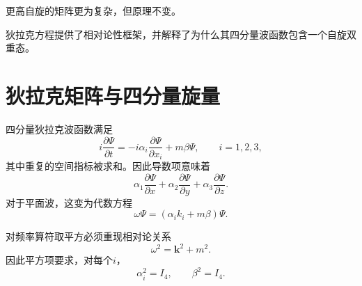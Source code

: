更高自旋的矩阵更为复杂，但原理不变。

\begin{classroomqa}
\end{classroomqa}

\begin{classroomqa}
\end{classroomqa}

狄拉克方程提供了相对论性框架，并解释了为什么其四分量波函数包含一个自旋双重态。

\section{狄拉克矩阵与四分量旋量}

四分量狄拉克波函数满足
\begin{equation}
i\frac{\partial\Psi}{\partial t}
=
-i\alpha_i\frac{\partial\Psi}{\partial x_i}
+m\beta\Psi,
\qquad i=1,2,3,
\end{equation}
其中重复的空间指标被求和。因此导数项意味着
\begin{equation}
\alpha_1\frac{\partial\Psi}{\partial x}
+\alpha_2\frac{\partial\Psi}{\partial y}
+\alpha_3\frac{\partial\Psi}{\partial z}.
\end{equation}
对于平面波，这变为代数方程
\begin{equation}
\omega\Psi=(\alpha_i k_i+m\beta)\Psi.
\end{equation}

\begin{classroomqa}
\end{classroomqa}

对频率算符取平方必须重现相对论关系
\begin{equation}
\omega^2=\mathbf{k}^2+m^2.
\end{equation}
因此平方项要求，对每个\(i\)，
\begin{equation}
\alpha_i^2=I_4,
\qquad
\beta^2=I_4.
\end{equation}

